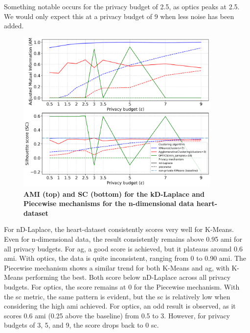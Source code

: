 {Something notable occurs for the privacy budget of 2.5, as \gls{optics} peaks at 2.5. We would only expect this at a privacy budget of 9 when less noise has been added.
\newpage
\begin{figure}[H]
  \centering

  \caption{\textbf{AMI (top) and SC (bottom) for the kD-Laplace and Piecewise mechanisms for the n-dimensional data heart-dataset}}
  \includegraphics[width=0.9\textwidth]{Results/nd-laplace/nd-Laplace/heart-dataset/ami-and-sc_9_dimensions.png}

  \label{fig:validation-heart-dataset_comparison_nd-laplace}
\end{figure}
For nD-Laplace, the heart-dataset consistently scores very well for K-Means. Even for n-dimensional data, the result consistently remains above 0.95 \gls{ami} for all privacy budgets.
For \gls{ag}, a good score is achieved, but it plateaus around 0.6 \gls{ami}.
With \gls{optics}, the data is quite inconsistent, ranging from 0 to 0.90 \gls{ami}.
The Piecewise mechanism shows a similar trend for both K-Means and \gls{ag}, with K-Means performing the best. Both score below nD-Laplace across all privacy budgets.
For \gls{optics}, the score remains at 0 for the Piecewise mechanism.
With the \gls{sc} metric, the same pattern is evident, but the \gls{sc} is relatively low when considering the high \gls{ami} achieved. For \gls{optics}, an odd result is observed, as it scores 0.6 \gls{ami} (0.25 above the baseline) from 0.5 to 3. However, for privacy budgets of 3, 5, and 9, the score drops back to 0 \gls{sc}.


}
